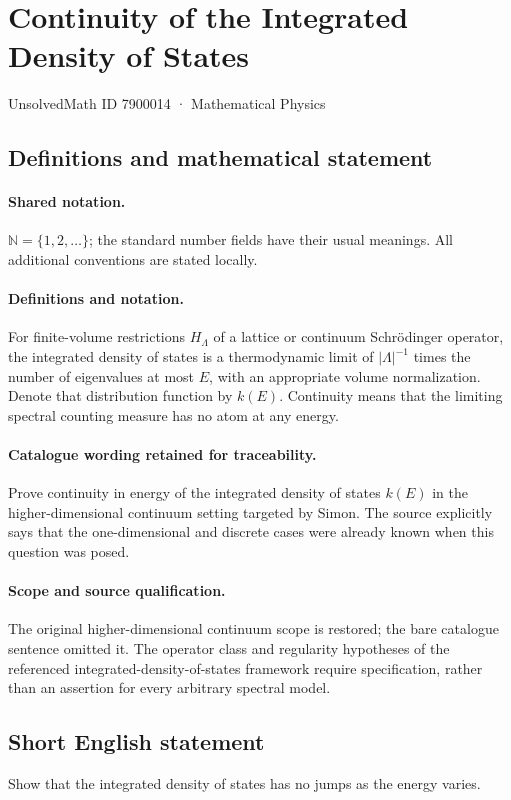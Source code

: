 \documentclass[11pt]{article}
\begin{document}
\setcounter{section}{7900013}
\section{Continuity of the Integrated Density of States}\label{7900014}
{\small UnsolvedMath ID 7900014 · Mathematical Physics}
\subsection{Definitions and mathematical statement}

\paragraph{Shared notation.}$\mathbb N=\{1,2,\ldots\}$; the standard number fields have their usual meanings. All additional conventions are stated locally.


\paragraph{Definitions and notation.}For finite-volume restrictions $H_\Lambda$ of a lattice or continuum Schrödinger operator, the integrated density of states is a thermodynamic limit of $|\Lambda|^{-1}$ times the number of eigenvalues at most $E$, with an appropriate volume normalization. Denote that distribution function by $k(E)$. Continuity means that the limiting spectral counting measure has no atom at any energy.

\paragraph{Catalogue wording retained for traceability.}
Prove continuity in energy of the integrated density of states $k(E)$ in the higher-dimensional continuum setting targeted by Simon. The source explicitly says that the one-dimensional and discrete cases were already known when this question was posed.
\paragraph{Scope and source qualification.}The original higher-dimensional continuum scope is restored; the bare catalogue sentence omitted it. The operator class and regularity hypotheses of the referenced integrated-density-of-states framework require specification, rather than an assertion for every arbitrary spectral model.
\subsection{Short English statement}
Show that the integrated density of states has no jumps as the energy varies.
\end{document}
